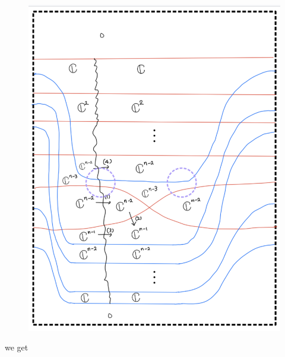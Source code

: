 \begin{enumerate}[label = (\roman*)]
\begin{enumerate}[label = (Case \arabic*)]
\begin{enumerate}[label = (Step \arabic*)]
\begin{figure}[H]
    \centering
    \includegraphics[scale = 0.95]{diagrams/cobord_gen/16.png}
    \caption{}
    \label{fig:your-label}
\end{figure}
\pagebreak
we get


\end{enumerate}
\end{enumerate}
\end{enumerate}
